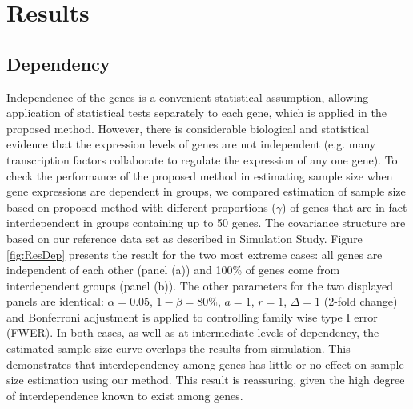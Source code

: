 \documentclass[12pt]{article}
\begin{document}
\section{Results}

\subsection{Dependency}

Independence of the genes is a convenient statistical assumption,
allowing application of statistical tests separately to each gene,
which is applied in the proposed method.  However, there is
considerable biological and statistical evidence that the
expression levels of genes are not independent (e.g. many
transcription factors collaborate to regulate the expression of
any one gene). To check the performance of the proposed method in
estimating sample size when gene expressions are dependent in
groups, we compared estimation of sample size based on proposed
method with different proportions ($\gamma$) of genes that are in
fact interdependent in groups containing up to 50 genes. The
covariance structure are based on our reference data set as
described in Simulation Study. Figure \ref{fig:ResDep} presents
the result for the two most extreme cases: all genes are
independent of each other (panel (a)) and 100\% of genes come from
interdependent groups (panel (b)). The other parameters for the
two displayed panels are identical: $\alpha = 0.05$, $1 - \beta =
80\%$, $a = 1$, $r = 1$, $\Delta = 1$ (2-fold change) and Bonferroni
adjustment is applied to controlling family wise type I error
(FWER). In both cases, as well as at intermediate levels of
dependency, the
estimated sample size curve overlaps the results from simulation.
This demonstrates that interdependency among genes has little or
no effect on sample size estimation using our method. This result
is reassuring, given the high degree of interdependence known to
exist among genes.
\end{document}
